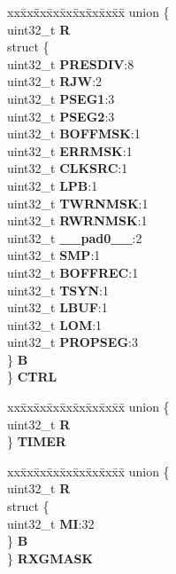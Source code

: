 \begin{DoxyCompactItemize}
\begin{tabbing}
\end{tabbing}\item 
\mbox{\label{structFLEXCAN__tag_ad87f9e12bd0c74dee3a33f921bb84c7c}} 
\begin{tabbing}
xx\=xx\=xx\=xx\=xx\=xx\=xx\=xx\=xx\=\kill
union \{\\
\>uint32\_t {\bfseries R}\\
\>struct \{\\
\>\>uint32\_t {\bfseries PRESDIV}:8\\
\>\>uint32\_t {\bfseries RJW}:2\\
\>\>uint32\_t {\bfseries PSEG1}:3\\
\>\>uint32\_t {\bfseries PSEG2}:3\\
\>\>uint32\_t {\bfseries BOFFMSK}:1\\
\>\>uint32\_t {\bfseries ERRMSK}:1\\
\>\>uint32\_t {\bfseries CLKSRC}:1\\
\>\>uint32\_t {\bfseries LPB}:1\\
\>\>uint32\_t {\bfseries TWRNMSK}:1\\
\>\>uint32\_t {\bfseries RWRNMSK}:1\\
\>\>uint32\_t {\bfseries \_\_pad0\_\_}:2\\
\>\>uint32\_t {\bfseries SMP}:1\\
\>\>uint32\_t {\bfseries BOFFREC}:1\\
\>\>uint32\_t {\bfseries TSYN}:1\\
\>\>uint32\_t {\bfseries LBUF}:1\\
\>\>uint32\_t {\bfseries LOM}:1\\
\>\>uint32\_t {\bfseries PROPSEG}:3\\
\>\} {\bfseries B}\\
\} {\bfseries CTRL}\\

\end{tabbing}\item 
\mbox{\label{structFLEXCAN__tag_a648617067ecaf7e16ba3e0a772ee39ad}} 
\begin{tabbing}
xx\=xx\=xx\=xx\=xx\=xx\=xx\=xx\=xx\=\kill
union \{\\
\>uint32\_t {\bfseries R}\\
\} {\bfseries TIMER}\\

\end{tabbing}\item 
\mbox{\label{structFLEXCAN__tag_a2ab2f4aeac5c5d1844f58f88603d2ae1}} 
\begin{tabbing}
xx\=xx\=xx\=xx\=xx\=xx\=xx\=xx\=xx\=\kill
union \{\\
\>uint32\_t {\bfseries R}\\
\>struct \{\\
\>\>uint32\_t {\bfseries MI}:32\\
\>\} {\bfseries B}\\
\} {\bfseries RXGMASK}\\


\end{tabbing}
\end{DoxyCompactItemize}
